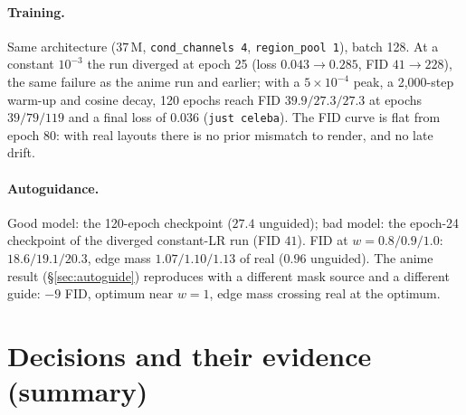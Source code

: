 \documentclass[11pt]{article}
\begin{document}
\paragraph{Training.} Same architecture ($37$\,M, \texttt{cond\_channels 4},
\texttt{region\_pool 1}), batch 128. At a constant $10^{-3}$ the run diverged at epoch
25 (loss $0.043\to0.285$, FID $41\to228$), the same failure as the anime run and earlier;
with a $5\times10^{-4}$ peak, a 2{,}000-step warm-up and cosine decay, 120 epochs reach
FID $39.9/27.3/27.3$ at epochs $39/79/119$ and a final loss of $0.036$
(\texttt{just celeba}). The FID curve is flat from epoch 80: with real layouts there is
no prior mismatch to render, and no late drift.

\paragraph{Autoguidance.} Good model: the 120-epoch checkpoint ($27.4$ unguided);
bad model: the epoch-24 checkpoint of the diverged constant-LR run (FID $41$). FID at
$w=0.8/0.9/1.0$: $\mathbf{18.6}/19.1/20.3$, edge mass $1.07/1.10/1.13$ of real
($0.96$ unguided). The anime result (\S\ref{sec:autoguide}) reproduces with a different
mask source and a different guide: $-9$ FID, optimum near $w=1$, edge mass crossing real
at the optimum.

\section{Decisions and their evidence (summary)}\label{sec:decisions}
\end{document}
